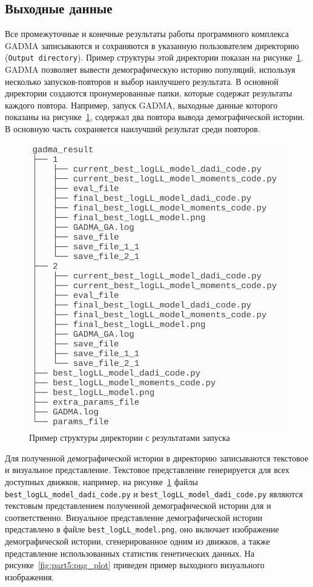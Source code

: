\subsection{Выходные данные}

Все промежуточные и конечные результаты работы программного комплекса GADMA записываются и сохраняются в указанную пользователем директорию (\texttt{Output directory}).
Пример структуры этой директории показан на рисунке~\ref{fig:part5:directory}.
GADMA позволяет вывести демографическую историю популяций, используя несколько запусков-повторов и выбор наилучшего результата.
В основной директории создаются пронумерованные папки, которые содержат результаты каждого повтора.
Например, запуск GADMA, выходные данные которого показаны на рисунке~\ref{fig:part5:directory}, содержал два повтора вывода демографической истории.
В основную часть сохраняется наилучший результат среди повторов.

\begin{figure}[!htbp]
    \centering
    \includegraphics[width=0.5\linewidth]{images/part5/directory_example.png}
    \caption{Пример структуры директории с результатами запуска}
    \label{fig:part5:directory}
\end{figure}

Для полученной демографической истории в директорию записываются текстовое и визуальное представление.
Текстовое представление генерируется для всех доступных движков, например, на рисунке~\ref{fig:part5:directory} файлы \texttt{best\_logLL\_model\_dadi\_code.py} и \texttt{best\_logLL\_model\_dadi\_code.py} являются текстовым представлением полученной демографической истории для \dadi и \moments соответственно.
Визуальное представление демографической истории представлено в файле \texttt{best\_logLL\_model.png}, оно включает изображение демографической истории, сгенерированное одним из движков, а также представление использованных статистик генетических данных.
На рисунке~\ref{fig:part5:png_plot} приведен пример выходного визуального изображения.

